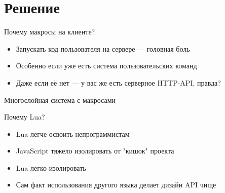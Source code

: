 \documentclass[aspectratio=169,handout,bigger]{beamer}
\begin{document}

\section{Решение}


\begin{frame}{Почему макросы на клиенте?}

\begin{itemize}
\item Запускать код пользователя на сервере — головная боль
\item Особенно если уже есть система пользовательских команд
\item Даже если её нет — у вас же есть серверное HTTP-API, правда?
\end{itemize}

\end{frame}


\begin{frame}{Многослойная система с макросами}


\end{frame}


\begin{frame}{Почему Lua?}

\begin{itemize}
\item Lua легче освоить непрограммистам
\item JavaScript тяжело изолировать от "кишок" проекта
\item Lua легко изолировать
\item Сам факт использования другого языка делает дизайн API чище
\end{itemize}

\end{frame}
\end{document}
